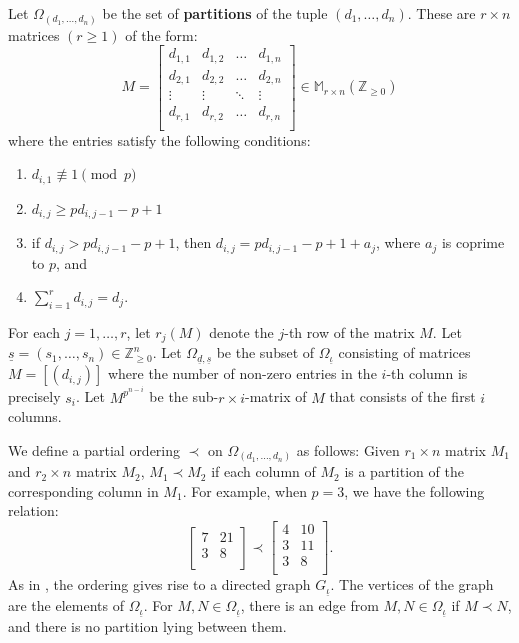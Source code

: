 \documentclass{compositio}
\newcommand{\mat}[1]{\todo[color=green]{MH: #1}}
\theoremstyle{remark}
\theoremstyle{remark}
\begin{document}
Let $\Omega_{(d_1,\ldots,d_n)}$ be the set of \textbf{partitions} of the tuple $(d_1,\ldots,d_n)$.
These are $r\times n$ matrices $(r \geq 1)$ of the form:
               \[ M=\begin{bmatrix}\label{matrixpartition}
d_{1,1} & d_{1,2} & \ldots & d_{1,n} \\
d_{2,1} & d_{2,2} & \ldots & d_{2,n} \\
\vdots  & \vdots  & \ddots & \vdots  \\
d_{r,1} & d_{r,2} & \ldots & d_{r,n} \\
\end{bmatrix} \in \mathbb{M}_{r \times n}(\mathbb{Z}_{\ge 0}) \]
where the entries satisfy the following conditions:
\begin{enumerate}[label*=\arabic*.]
\item \label{item1condbranchingdatum} $d_{i,1} \not\equiv 1 \pmod{p}$
\item \label{item2condbranchingdatum} $d_{i,j} \geq pd_{i,j-1}-p+1$
\item \label{item3condbranchingdatum} if $d_{i,j}>pd_{i,j-1}-p+1$, then $d_{i,j}=pd_{i,j-1}-p+1+a_j$, where $a_j$ is coprime to $p$, and 
\item \label{item4condbranchingdatum} $\sum_{i=1}^r d_{i,j}=d_j$.
\end{enumerate}
For each $j=1,\ldots,r$, let $r_j(M)$ denote the $j$-th row of the matrix $M$. Let $\underline{s}=(s_1, \ldots, s_n) \in \mathbb{Z}_{\ge 0}^n$. Let $\Omega_{\underline{d}, \underline{s}}$ be the subset of $\Omega_{\underline{\iota}}$ consisting of matrices $M=[(d_{i,j})]$ where the number of non-zero entries in the $i$-th column is precisely $s_i$. Let $M^{p^{n-i}}$ be the sub-$r \times i$-matrix of $M$ that consists of the first $i$ columns.

We define a partial ordering $\prec$ on $\Omega_{(d_1,\ldots,d_n)}$ as follows: Given $r_1\times n$ matrix $M_1$ and $r_2\times n$ matrix $M_2$, $M_1 \prec M_2$ if each column of $M_2$ is a partition of the corresponding column in $M_1$. For example, when $p=3$, we have the following relation:
\[  \begin{bmatrix}
7 & 21 \\
3 & 8 \\
\end{bmatrix} \prec \begin{bmatrix}
   4 & 10 \\
   3 & 11 \\
   3 & 8\\
   \end{bmatrix}.  \]
As in \cite{MR2985514}, the ordering gives rise to a directed graph $G_{\underline{\iota}}$. The vertices of the graph are the elements of $\Omega_{\underline{\iota}}$. For $M, N \in \Omega_{\underline{\iota}}$, there is an edge from $M, N \in \Omega_{\underline{\iota}}$ if $M \prec N$, and there is no partition lying between them. 
\end{document}
